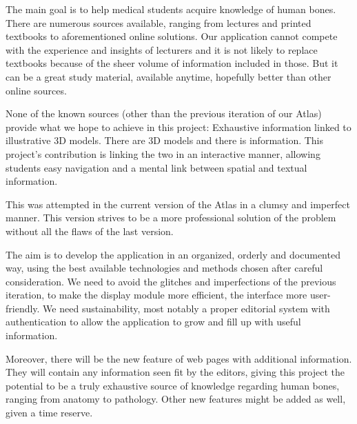 The main goal is to help medical students acquire knowledge of human bones. There are numerous sources available, ranging from lectures and printed textbooks to aforementioned online solutions. Our application cannot compete with the experience and insights of lecturers and it is not likely to replace textbooks because of the sheer volume of information included in those. But it can be a great study material, available anytime, hopefully better than other online sources.

None of the known sources (other than the previous iteration of our Atlas) provide what we hope to achieve in this project: Exhaustive information linked to illustrative 3D models. There are 3D models and there is information. This project’s contribution is linking the two in an interactive manner, allowing students easy navigation and a mental link between spatial and textual information.

This was attempted in the current version of the Atlas in a clumsy and imperfect manner. This version strives to be a more professional solution of the problem without all the flaws of the last version.

The aim is to develop the application in an organized, orderly and documented way, using the best available technologies and methods chosen after careful consideration. We need to avoid the glitches and imperfections of the previous iteration, to make the display module more efficient, the interface more user-friendly. We need sustainability, most notably a proper editorial system with authentication to allow the application to grow and fill up with useful information.

Moreover, there will be the new feature of web pages with additional information. They will contain any information seen fit by the editors, giving this project the potential to be a truly exhaustive source of knowledge regarding human bones, ranging from anatomy to pathology. Other new features might be added as well, given a time reserve.